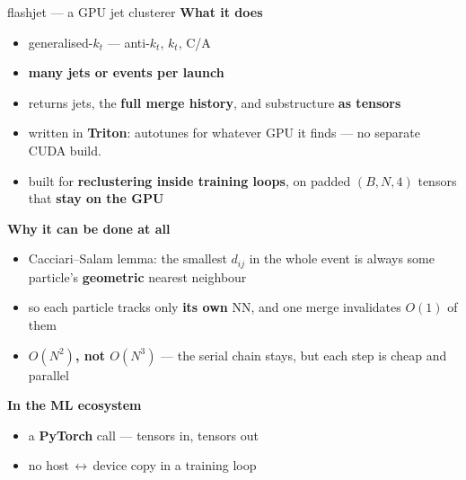 \documentclass[aspectratio=169,10pt]{beamer}
\newcommand{\akt}{anti-$k_t$}
\begin{document}
\begin{frame}{flashjet --- a GPU jet clusterer}
\textbf{What it does}
\begin{itemize}\setlength\itemsep{0.1em}
  \item generalised-$k_t$ --- \akt, $k_t$, C/A
  \item \textbf{many jets or events per launch}
  \item returns jets, the \textbf{full merge history}, and substructure
        \textbf{as tensors}
    \item written in 
\textbf{Triton}: autotunes for whatever
GPU it finds — no separate CUDA build.
  \item[$\Rightarrow$] built for \textbf{reclustering inside training loops}, on
        padded $(B,N,4)$ tensors that \textbf{stay on the GPU}
\end{itemize}
\vspace{-0.1em}

\textbf{Why it can be done at all}
\begin{itemize}\setlength\itemsep{0.1em}
  \item Cacciari--Salam lemma: the smallest $d_{ij}$ in the whole event is
        always some particle's \textbf{geometric} nearest neighbour
  \item so each particle tracks only \textbf{its own} NN, and one merge
        invalidates $O(1)$ of them
  \item[$\Rightarrow$] \textbf{$O(N^2)$, not $O(N^3)$} --- the serial chain
        stays, but each step is cheap and parallel
\end{itemize}
\vspace{-0.1em}

\textbf{In the ML ecosystem}
\begin{itemize}\setlength\itemsep{0.1em}
  \item a \textbf{PyTorch} call --- tensors in, tensors out
  \item no host\,$\leftrightarrow$\,device copy in a training loop
\end{itemize}
\end{frame}
\end{document}
